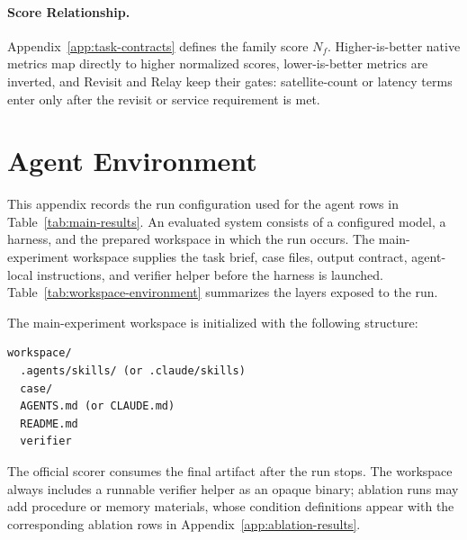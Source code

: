 \documentclass[11pt]{article}
\begin{document}
\paragraph{Score Relationship.} Appendix~\ref{app:task-contracts} defines the family score \(N_f\). Higher-is-better native metrics map directly to higher normalized scores, lower-is-better metrics are inverted, and Revisit and Relay keep their gates: satellite-count or latency terms enter only after the revisit or service requirement is met.

\section{Agent Environment}
\label{app:agent-workspace}

This appendix records the run configuration used for the agent rows in Table~\ref{tab:main-results}. An evaluated system consists of a configured model, a harness, and the prepared workspace in which the run occurs. The main-experiment workspace supplies the task brief, case files, output contract, agent-local instructions, and verifier helper before the harness is launched. Table~\ref{tab:workspace-environment} summarizes the layers exposed to the run.

The main-experiment workspace is initialized with the following structure:
\begin{Verbatim}[fontsize=\scriptsize, frame=single, framesep=1mm]
workspace/
  .agents/skills/ (or .claude/skills)
  case/
  AGENTS.md (or CLAUDE.md)
  README.md
  verifier
\end{Verbatim}

The official scorer consumes the final artifact after the run stops. The workspace always includes a runnable verifier helper as an opaque binary; ablation runs may add procedure or memory materials, whose condition definitions appear with the corresponding ablation rows in Appendix~\ref{app:ablation-results}.
\end{document}
